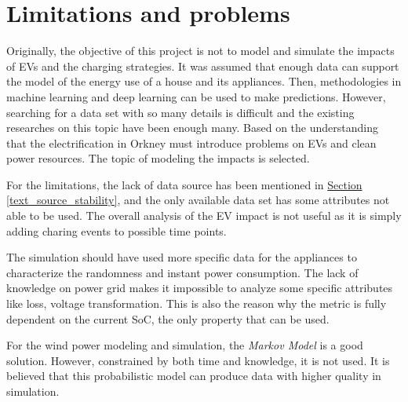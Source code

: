 \documentclass[12pt,a4paper]{report}
\begin{document}
        \section{Limitations and problems}
        Originally, the objective of this project is not to model and simulate the impacts of EVs and the charging strategies. It was assumed that enough data can support the model of the energy use of a house and its appliances. Then, methodologies in machine learning and deep learning can be used to make predictions. However, searching for a data set with so many details is difficult and the existing researches on this topic have been enough many. Based on the understanding that the electrification in Orkney must introduce problems on EVs and clean power resources. The topic of modeling the impacts is selected.

        For the limitations, the lack of data source has been mentioned in \hyperref[text_source_stability]{Section \ref*{text_source_stability}}, and the only available data set has some attributes not able to be used. The overall analysis of the EV impact is not useful as it is simply adding charing events to possible time points.

        The simulation should have used more specific data for the appliances to characterize the randomness and instant power consumption. The lack of knowledge on power grid makes it impossible to analyze some specific attributes like loss, voltage transformation. This is also the reason why the metric is fully dependent on the current SoC, the only property that can be used.

        For the wind power modeling and simulation, the \emph{Markov Model} is a good solution. However, constrained by both time and knowledge, it is not used. It is believed that this probabilistic model can produce data with higher quality in simulation.
            
\end{document}

